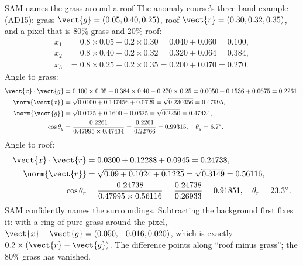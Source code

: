\begin{worked}[label={we:material:mixed}]{SAM names the grass around a roof}
The anomaly course's three-band example (AD15): grass $\vect{g}=(0.05,0.40,0.25)$, roof
$\vect{r}=(0.30,0.32,0.35)$, and a pixel that is 80\% grass and 20\% roof:
\begin{align*}
x_1 &= 0.8\times0.05+0.2\times0.30 = 0.040+0.060 = 0.100,\\
x_2 &= 0.8\times0.40+0.2\times0.32 = 0.320+0.064 = 0.384,\\
x_3 &= 0.8\times0.25+0.2\times0.35 = 0.200+0.070 = 0.270.
\end{align*}
Angle to grass:
\begin{align*}
\vect{x}\cdot\vect{g} &= 0.100\times0.05+0.384\times0.40+0.270\times0.25 = 0.0050+0.1536+0.0675 = 0.2261,\\
\norm{\vect{x}} &= \sqrt{0.0100+0.147456+0.0729} = \sqrt{0.230356} = 0.47995,\\
\norm{\vect{g}} &= \sqrt{0.0025+0.1600+0.0625} = \sqrt{0.2250} = 0.47434,\\
\cos\theta_g &= \frac{0.2261}{0.47995\times0.47434} = \frac{0.2261}{0.22766} = 0.99315,
\quad\theta_g = 6.7^\circ.
\end{align*}
Angle to roof:
\begin{align*}
\vect{x}\cdot\vect{r} &= 0.0300+0.12288+0.0945 = 0.24738,\\
\norm{\vect{r}} &= \sqrt{0.09+0.1024+0.1225} = \sqrt{0.3149} = 0.56116,\\
\cos\theta_r &= \frac{0.24738}{0.47995\times0.56116} = \frac{0.24738}{0.26933} = 0.91851,
\quad\theta_r = 23.3^\circ.
\end{align*}
SAM confidently names the surroundings. Subtracting the background first fixes it: with a ring of pure grass
around the pixel, $\vect{x}-\vect{g}=(0.050,-0.016,0.020)$, which is exactly $0.2\times(\vect{r}-\vect{g})$.
The difference points along ``roof minus grass''; the 80\% grass has vanished.
\end{worked}

